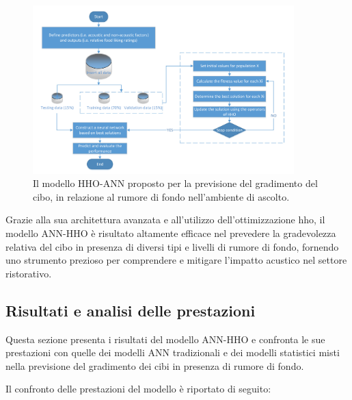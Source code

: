 \begin{figure}[H]
      \centering
      \includegraphics[width=0.9\textwidth]{Chapters/Figures/HHO-ANN.png}
      \caption{Il modello HHO-ANN proposto per la previsione del gradimento del cibo, in relazione al rumore di fondo nell'ambiente di ascolto.}
      \label{hho-ann}
\end{figure}

Grazie alla sua architettura avanzata e all'utilizzo dell'ottimizzazione \gls{hho}, il modello ANN-HHO è risultato altamente efficace nel prevedere la gradevolezza relativa del cibo in presenza di diversi tipi e livelli di rumore di fondo, fornendo uno strumento prezioso per comprendere e mitigare l'impatto acustico nel settore ristorativo.

\subsection{Risultati e analisi delle prestazioni}
\noindent

Questa sezione presenta i risultati del modello ANN-HHO e confronta le sue prestazioni con quelle dei modelli ANN tradizionali e dei modelli statistici misti nella previsione del gradimento dei cibi in presenza di rumore di fondo.

Il confronto delle prestazioni del modello è riportato di seguito:

